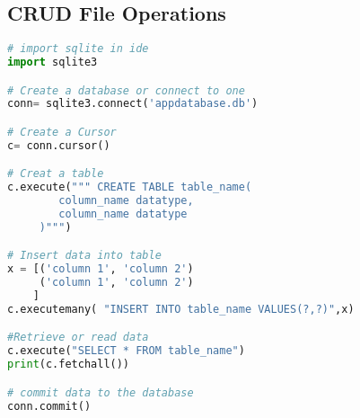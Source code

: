 \subsection{CRUD File Operations}
\begin{lstlisting}[language=python, caption=db.py]
# import sqlite in ide 
import sqlite3

# Create a database or connect to one 
conn= sqlite3.connect('appdatabase.db')

# Create a Cursor
c= conn.cursor()

# Creat a table
c.execute(""" CREATE TABLE table_name( 
        column_name datatype,
        column_name datatype
     )""")

# Insert data into table
x = [('column 1', 'column 2')
     ('column 1', 'column 2')
    ]
c.executemany( "INSERT INTO table_name VALUES(?,?)",x)

#Retrieve or read data 
c.execute("SELECT * FROM table_name")
print(c.fetchall())

# commit data to the database
conn.commit()
\end{lstlisting}